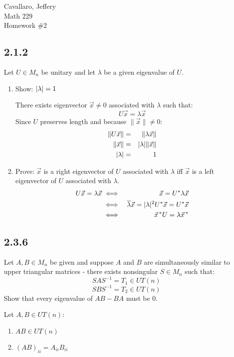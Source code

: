 \documentclass[letterpaper,12pt,fleqn]{article}
\renewcommand{\l}{\lambda}
\newcommand{\vx}{\vec{x}}
\renewcommand{\l}{\lambda}
\begin{document}
Cavallaro, Jeffery \\
Math 229 \\
Homework \#2

\bigskip

\subsection*{2.1.2}

Let $U\in M_n$ be unitary and let $\l$ be a given eigenvalue of $U$.
\begin{enumerate}[label={\alph*)}]
\item Show: $\abs{\l}=1$

  There exists eigenvector $\vx\ne0$ associated with $\l$ such that:
  \[U\vx=\l\vx\]
  Since $U$ preserves length and because $\|\vx\|\ne0$:
  \begin{eqnarray*}
    \|U\vx\| &=& \|\l\vx\| \\
    \|\vx\| &=& \abs{\l}\|\vx\| \\
    \abs{\l} &=& 1
  \end{eqnarray*}

\item Prove: $\vx$ is a right eigenvector of $U$ associated with $\l$ iff
  $\vx$ is a left eigenvector of $U$ associated with $\l$.
  \begin{eqnarray*}
    U\vx=\l\vx &\iff& \vx=U^*\l\vx \\
    &\iff& \overline{\l}\vx=\abs{\l}^2U^*\vx=U^*\vx \\
    &\iff& \vx^{\,*}U=\l\vx^{\,*}
  \end{eqnarray*}
\end{enumerate}

\subsection*{2.3.6}

Let $A,B\in M_n$ be given and suppose $A$ and $B$ are simultaneously similar to
upper triangular matrices - there exists nonsingular $S\in M_n$ such that:
\[SAS^{-1}=T_1\in UT(n)\]
\[SBS^{-1}=T_2\in UT(n)\]
Show that every eigenvalue of $AB-BA$ must be 0.

\begin{lemma}
  Let $A,B\in UT(n)$:
  \begin{enumerate}
  \item $AB\in UT(n)$
  \item $(AB)_{ii}=A_{ii}B_{ii}$
  \end{enumerate}
\end{lemma}
\end{document}
